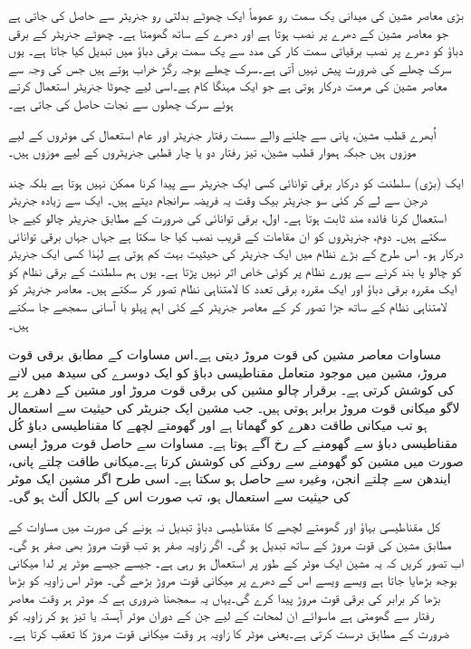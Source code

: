 بڑی معاصر مشین کی  میدانی یک سمت  رو عموماً  ایک چھوٹے بدلتی  رو جنریٹر سے حاصل کی جاتی ہے جو معاصر مشین کے دھرے پر  نصب ہوتا ہے اور دھرے  کے ساتھ  گھومتا ہے۔ چھوٹے جنریٹر کے برقی دباؤ کو دھرے پر  نصب برقیاتی سمت کار کی مدد سے یک سمت  برقی دباؤ میں تبدیل کیا جاتا ہے۔ یوں سرک چھلے کی ضرورت پیش نہیں آتی ہے۔سرک چھلے بوجہ  رگڑ خراب ہوتے ہیں جس کی وجہ سے معاصر مشین کی مرمت درکار ہوتی ہے جو  ایک مہنگا کام ہے۔اسی لیے چھوٹا  جنریٹر استعمال کرتے ہوئے سرک چھلوں سے نجات حاصل کی جاتی ہے۔

اُبھرے قطب مشین، پانی سے چلنے والے سست رفتار جنریٹر اور  عام استعمال کی موٹروں کے لیے موزوں  ہیں جبکہ ہموار قطب مشین، تیز رفتار دو یا چار قطبی  جنریٹروں کے لیے موزوں  ہیں۔

ایک (بڑی) سلطنت کو درکار برقی توانائی  کسی ایک  جنریٹر سے پیدا کرنا ممکن نہیں ہوتا ہے بلکہ چند درجن سے لے کر کئی سو  جنریٹر بیک وقت یہ فریضہ سرانجام دیتے  ہیں۔ ایک سے زیادہ جنریٹر استعمال کرنا فائدہ مند ثابت ہوتا ہے۔ اول، برقی توانائی کی ضرورت کے مطابق جنریٹر چالو کیے جا سکتے ہیں۔ دوم،  جنریٹروں کو ان مقامات کے قریب نصب کیا جا سکتا ہے جہاں جہاں برقی توانائی درکار ہو۔ اس طرح کے بڑے نظام میں ایک جنریٹر کی حیثیت بہت کم ہوتی ہے لہٰذا کسی ایک جنریٹر کو چالو یا بند کرنے سے پورے نظام پر کوئی خاص اثر نہیں پڑتا ہے۔ یوں ہم سلطنت کے برقی نظام کو ایک مقررہ برقی دباؤ اور ایک مقررہ برقی تعدد کا لامتناہی نظام تصور کر سکتے ہیں۔ معاصر جنریٹر کو لامتناہی نظام کے ساتھ جڑا تصور کر کے معاصر جنریٹر کے کئی اہم پہلو با آسانی سمجھے جا سکتے ہیں۔

مساوات    معاصر مشین کی قوت مروڑ دیتی ہے۔اس مساوات کے مطابق برقی قوت مروڑ، مشین میں موجود متعامل مقناطیسی دباؤ کو ایک دوسرے کی سیدھ میں لانے کی کوشش کرتی ہے۔ برقرار  چالو  مشین کی  برقی قوت مروڑ اور مشین کے دھرے پر لاگو میکانی قوت مروڑ برابر ہوتی ہیں۔ جب مشین ایک جنریٹر کی حیثیت سے استعمال ہو تب میکانی طاقت  دھرے کو گھماتا ہے اور گھومتے لچھے کا مقناطیسی دباؤ کُل مقناطیسی دباؤ سے گھومنے کے رخ  آگے ہوتا ہے۔ مساوات  سے حاصل قوت مروڑ ایسی صورت میں مشین کو گھومنے سے روکنے کی کوشش کرتا ہے۔میکانی طاقت چلتے پانی، ایندھن سے چلتے انجن، وغیرہ سے حاصل ہو سکتا ہے۔ اسی طرح اگر مشین ایک موٹر کی حیثیت سے استعمال ہو، تب صورت اس کے بالکل اُلٹ ہو گی۔

کل مقناطیسی بہاؤ   اور گھومتے لچھے کا مقناطیسی دباؤ  تبدیل نہ ہونے کی صورت میں  مساوات  کے مطابق مشین کی قوت مروڑ   کے ساتھ تبدیل ہو گی۔ اگر زاویہ  صفر ہو تب  قوت مروڑ بھی صفر ہو گی۔ اب  تصور کریں کہ یہ مشین ایک موٹر کے طور پر استعمال ہو رہی ہے۔ جیسے جیسے موٹر پر لدا میکانی بوجھ بڑھایا جاتا ہے ویسے ویسے اس کے دھرے پر میکانی قوت مروڑ بڑھے گی۔ موٹر اس زاویہ کو بڑھا بڑھا کر برابر کی برقی قوت مروڑ پیدا کرے گی۔یہاں یہ سمجھنا ضروری ہے کہ موٹر ہر وقت معاصر رفتار سے گھومتی ہے ماسوائے ان لمحات کے لیے جن کے دوران موٹر آہستہ یا تیز  ہو کر زاویہ کو ضرورت کے مطابق درست کرتی ہے۔یعنی موٹر کا زاویہ  ہر وقت میکانی قوت مروڑ کا تعقب  کرتا ہے۔

